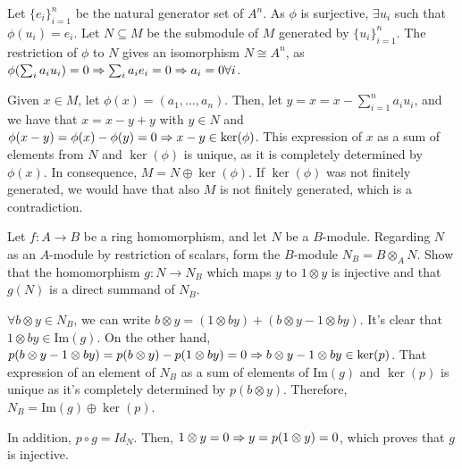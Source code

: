 \begin{sol}
	Let $\{e_i\}_{i = 1}^n$ be the natural generator set of $A^n$. As $\phi$ is surjective, $\exists u_i$ such that $\phi(u_i) = e_i$. Let $N \subseteq M$ be the submodule of $M$ generated by $\{u_i\}_{i = 1}^n$. The restriction of $\phi$ to $N$ gives an isomorphism $N \cong A^n$, as $\phi(\sum_i a_i u_i ) = 0 \Rightarrow \sum_i a_i e_i = 0 \Rightarrow a_i = 0 \forall i$. 

	Given $x \in M$, let $\phi(x) = (a_1, \dots, a_n)$. Then, let $y = x = x - \sum_{i = 1}^n a_i u_i$, and we have that $x = x - y + y$ with $y \in N$ and $\phi(x-y) = \phi(x)-\phi(y) = 0 \Rightarrow x-y \in \ker(\phi)$. This expression of $x$ as a sum of elements from $N$ and $\ker(\phi)$ is unique, as it is completely determined by $\phi(x)$. In consequence, $M = N \oplus \ker(\phi)$. If $\ker(\phi)$ was not finitely generated, we would have that also $M$ is not finitely generated, which is a contradiction. 
\end{sol}

\begin{ex}
	Let $f: A \to B$ be a ring homomorphism, and let $N$ be a $B$-module. Regarding $N$ as an $A$-module by restriction of scalars, form the $B$-module $N_B = B \otimes_A N$. Show that the homomorphism $g: N \to N_B$ which maps $y$ to $1 \otimes y$ is injective and that $g(N)$ is a direct summand of $N_B$.
\end{ex}

\begin{sol}
	$\forall b \otimes y \in N_B$, we can write $b \otimes y = (1 \otimes by) + (b \otimes y - 1 \otimes by)$. It's clear that $1 \otimes by \in \text{Im}(g)$. On the other hand, $p(b \otimes y - 1 \otimes by) = p(b \otimes y) - p(1 \otimes by) = 0 \Rightarrow b \otimes y - 1 \otimes by \in \ker(p)$. That expression of an element of $N_B$ as a sum of elements of $\text{Im}(g)$ and $\ker(p)$ is unique as it's completely determined by $p(b \otimes y)$. Therefore, $N_B = \text{Im}(g) \oplus \ker(p)$.

	In addition, $p \circ g = Id_{N}$. Then, $1 \otimes y = 0 \Rightarrow y = p(1 \otimes y) = 0$, which proves that $g$ is injective.
\end{sol}


